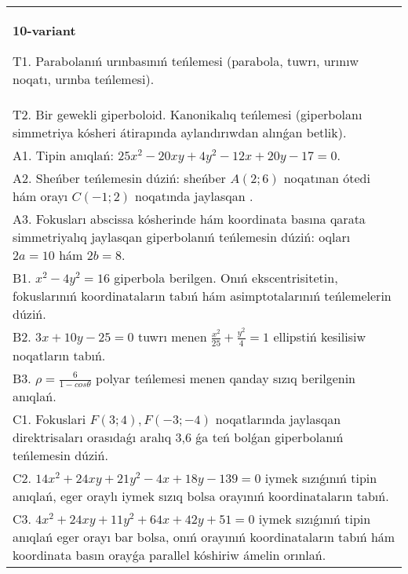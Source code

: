 \documentclass{article}
\begin{document}
\begin{tabular}{m{17cm}}
\textbf{10-variant}
\newline

T1. Parabolanıń urınbasınıń teńlemesi (parabola, tuwrı, urınıw noqatı, urınba teńlemesi).\\

T2. Bir gewekli giperboloid. Kanonikalıq teńlemesi (giperbolanı simmetriya kósheri átirapında aylandırıwdan alınǵan betlik).\\

A1. Tipin anıqlań: $25 x^{2}-20 xy+4 y^{2}-12 x+20 y-17=0$.\\

A2. Sheńber teńlemesin dúziń: sheńber $A (2;6 ) $ noqatınan ótedi hám orayı $C (-1;2) $ noqatında jaylasqan .\\

A3. Fokusları abscissa kósherinde hám koordinata basına qarata simmetriyalıq jaylasqan giperbolanıń teńlemesin dúziń: oqları $2 a=10$ hám $2 b=8$.\\

B1. $x^{2} - 4y^{2} = 16$ giperbola berilgen. Onıń ekscentrisitetin, fokuslarınıń koordinataların tabıń hám asimptotalarınıń teńlemelerin dúziń.\\

B2. $3x + 10y - 25 = 0$ tuwrı menen $\frac{x^{2}}{25} + \frac{y^{2}}{4} = 1$ ellipstiń kesilisiw noqatların tabıń.\\

B3. $\rho = \frac{6}{1 - cos\theta}$ polyar teńlemesi menen qanday sızıq berilgenin anıqlań.  \\

C1. Fokuslari $F(3;4), F(-3;-4)$ noqatlarında jaylasqan direktrisaları orasıdaǵı aralıq 3,6 ǵa teń bolǵan giperbolanıń teńlemesin dúziń.  \\

C2. $14x^{2} + 24xy + 21y^{2} - 4x + 18y - 139 = 0$ iymek sızıǵınıń tipin anıqlań, eger oraylı iymek sızıq bolsa orayınıń koordinataların tabıń.  \\

C3. $4x^{2} + 24xy + 11y^{2} + 64x + 42y + 51 = 0$ iymek sızıǵınıń tipin anıqlań eger orayı bar bolsa, onıń orayınıń koordinataların tabıń hám koordinata basın orayǵa parallel kóshiriw ámelin orınlań.  \\

\end{tabular}
\vspace{1cm}
\end{document}
